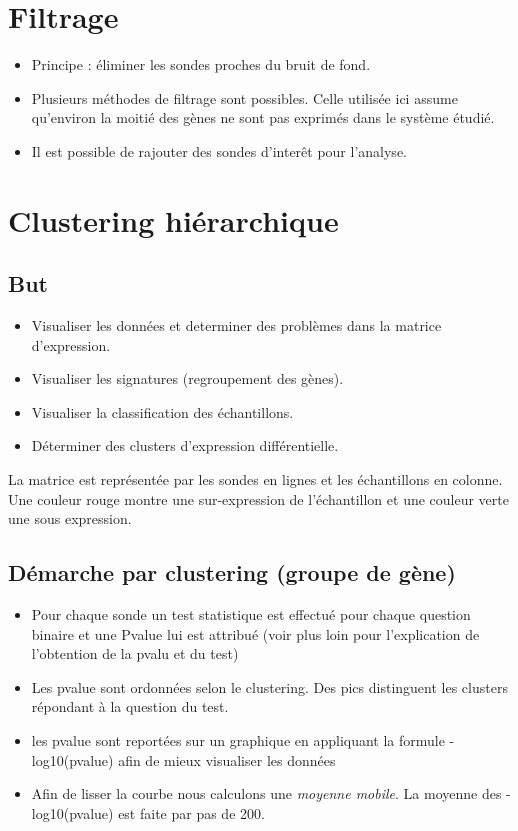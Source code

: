 \documentclass[a4paper]{article}
\begin{document}
\section*{Filtrage}
\begin{itemize}
\item Principe : éliminer les sondes proches du bruit de fond.
\item Plusieurs méthodes de filtrage sont possibles. Celle utilisée ici assume qu'environ la moitié des gènes ne sont pas exprimés dans le système étudié.
\item Il est possible de rajouter des sondes d'interêt pour l'analyse.

\end{itemize}

\section*{Clustering hiérarchique}
\subsection*{But}
\begin{itemize}
\item Visualiser les données et determiner des problèmes dans la matrice d'expression.
\item Visualiser les signatures (regroupement des gènes).
\item Visualiser la classification des échantillons.
\item Déterminer des clusters d'expression différentielle.
\end{itemize}
La matrice est représentée par les sondes en lignes et les échantillons en colonne. Une couleur rouge montre une sur-expression de l'échantillon et une couleur verte une sous expression.
%
\subsection*{Démarche par clustering (groupe de gène)}
\begin{itemize}
\item Pour chaque sonde un test statistique est effectué pour chaque question binaire et une Pvalue lui est attribué (voir plus loin pour l'explication de l'obtention de la pvalu et du test)
\item Les pvalue sont ordonnées selon le clustering. Des pics distinguent les clusters répondant à la question du test.
\item les pvalue sont reportées sur un graphique en appliquant la formule -log10(pvalue) afin de mieux visualiser les données
\item Afin de lisser la courbe nous calculons une \emph{moyenne mobile}. La moyenne des -log10(pvalue) est faite par pas de 200.
\end{itemize}
%
\end{document}
